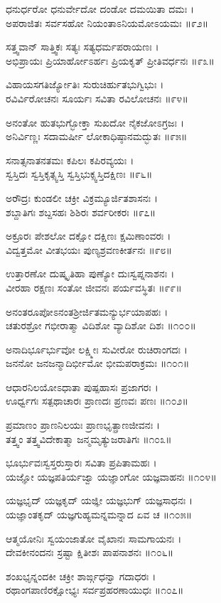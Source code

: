 ಧನುರ್ಧರೋ ಧನುರ್ವೇದೋ ದಂಡೋ ದಮಯಿತಾ ದಮಃ ।\\
ಅಪರಾಜಿತಃ ಸರ್ವಸಹೋ ನಿಯಂತಾಽನಿಯಮೋಽಯಮಃ ॥೯೨॥

ಸತ್ತ್ವವಾನ್ ಸಾತ್ತ್ವಿಕಃ ಸತ್ಯಃ ಸತ್ಯಧರ್ಮಪರಾಯಣಃ ।\\
ಅಭಿಪ್ರಾಯಃ ಪ್ರಿಯಾರ್ಹೋಽರ್ಹಃ ಪ್ರಿಯಕೃತ್ ಪ್ರೀತಿವರ್ಧನಃ ॥೯೩॥

ವಿಹಾಯಸಗತಿರ್ಜ್ಯೋತಿಃ ಸುರುಚಿರ್ಹುತಭುಗ್ವಿಭುಃ ।\\
ರವಿರ್ವಿರೋಚನಃ ಸೂರ್ಯಃ ಸವಿತಾ ರವಿಲೋಚನಃ ॥೯೪॥

ಅನಂತೋ ಹುತಭುಗ್ಭೋಕ್ತಾ ಸುಖದೋ ನೈಕಜೋಽಗ್ರಜಃ ।\\
ಅನಿರ್ವಿಣ್ಣಃ ಸದಾಮರ್ಷೀ ಲೋಕಾಧಿಷ್ಠಾನಮದ್ಭುತಃ ॥೯೫॥

ಸನಾತ್ಸನಾತನತಮಃ ಕಪಿಲಃ ಕಪಿರವ್ಯಯಃ ।\\
ಸ್ವಸ್ತಿದಃ ಸ್ವಸ್ತಿಕೃತ್ಸ್ವಸ್ತಿ ಸ್ವಸ್ತಿಭುಕ್ಸ್ವಸ್ತಿದಕ್ಷಿಣಃ ॥೯೬॥

ಅರೌದ್ರಃ ಕುಂಡಲೀ ಚಕ್ರೀ ವಿಕ್ರಮ್ಯೂರ್ಜಿತಶಾಸನಃ ।\\
ಶಬ್ದಾತಿಗಃ ಶಬ್ದಸಹಃ ಶಿಶಿರಃ ಶರ್ವರೀಕರಃ ॥೯೭॥

ಅಕ್ರೂರಃ ಪೇಶಲೋ ದಕ್ಷೋ ದಕ್ಷಿಣಃ ಕ್ಷಮಿಣಾಂವರಃ ।\\
ವಿದ್ವತ್ತಮೋ ವೀತಭಯಃ ಪುಣ್ಯಶ್ರವಣಕೀರ್ತನಃ ॥೯೮॥

ಉತ್ತಾರಣೋ ದುಷ್ಕೃತಿಹಾ ಪುಣ್ಯೋ ದುಃಸ್ವಪ್ನನಾಶನಃ ।\\
ವೀರಹಾ ರಕ್ಷಣಃ ಸಂತೋ ಜೀವನಃ ಪರ್ಯವಸ್ಥಿತಃ ॥೯೯॥

ಅನಂತರೂಪೋಽನಂತಶ್ರೀರ್ಜಿತಮನ್ಯುರ್ಭಯಾಪಹಃ ।\\
ಚತುರಶ್ರೋ ಗಭೀರಾತ್ಮಾ ವಿದಿಶೋ ವ್ಯಾದಿಶೋ ದಿಶಃ ॥೧೦೦॥

ಅನಾದಿರ್ಭೂರ್ಭುವೋ ಲಕ್ಷ್ಮೀಃ ಸುವೀರೋ ರುಚಿರಾಂಗದಃ ।\\
ಜನನೋ ಜನಜನ್ಮಾದಿರ್ಭೀಮೋ ಭೀಮಪರಾಕ್ರಮಃ ॥೧೦೧॥

ಆಧಾರನಿಲಯೋಽಧಾತಾ ಪುಷ್ಪಹಾಸಃ ಪ್ರಜಾಗರಃ ।\\
ಊರ್ಧ್ವಗಃ ಸತ್ಪಥಾಚಾರಃ ಪ್ರಾಣದಃ ಪ್ರಣವಃ ಪಣಃ ॥೧೦೨॥

ಪ್ರಮಾಣಂ ಪ್ರಾಣನಿಲಯಃ ಪ್ರಾಣಭೃತ್ಪ್ರಾಣಜೀವನಃ ।\\
ತತ್ತ್ವಂ ತತ್ತ್ವವಿದೇಕಾತ್ಮಾ ಜನ್ಮಮೃತ್ಯುಜರಾತಿಗಃ ॥೧೦೩॥

ಭೂರ್ಭುವಃಸ್ವಸ್ತರುಸ್ತಾರಃ ಸವಿತಾ ಪ್ರಪಿತಾಮಹಃ ।\\
ಯಜ್ಞೋ ಯಜ್ಞಪತಿರ್ಯಜ್ವಾ ಯಜ್ಞಾಂಗೋ ಯಜ್ಞವಾಹನಃ ॥೧೦೪॥

ಯಜ್ಞಭೃದ್ ಯಜ್ಞಕೃದ್ ಯಜ್ಞೀ ಯಜ್ಞಭುಗ್ ಯಜ್ಞಸಾಧನಃ ।\\
ಯಜ್ಞಾಂತಕೃದ್ ಯಜ್ಞಗುಹ್ಯಮನ್ನಮನ್ನಾದ ಏವ ಚ ॥೧೦೫॥

ಆತ್ಮಯೋನಿಃ ಸ್ವಯಂಜಾತೋ ವೈಖಾನಃ ಸಾಮಗಾಯನಃ ।\\
ದೇವಕೀನಂದನಃ ಸ್ರಷ್ಟಾ ಕ್ಷಿತೀಶಃ ಪಾಪನಾಶನಃ ॥೧೦೬॥

ಶಂಖಭೃನ್ನಂದಕೀ ಚಕ್ರೀ ಶಾರ್ಙ್ಗಧನ್ವಾ ಗದಾಧರಃ ।\\
ರಥಾಂಗಪಾಣಿರಕ್ಷೋಭ್ಯಃ ಸರ್ವಪ್ರಹರಣಾಯುಧಃ ॥೧೦೭॥


